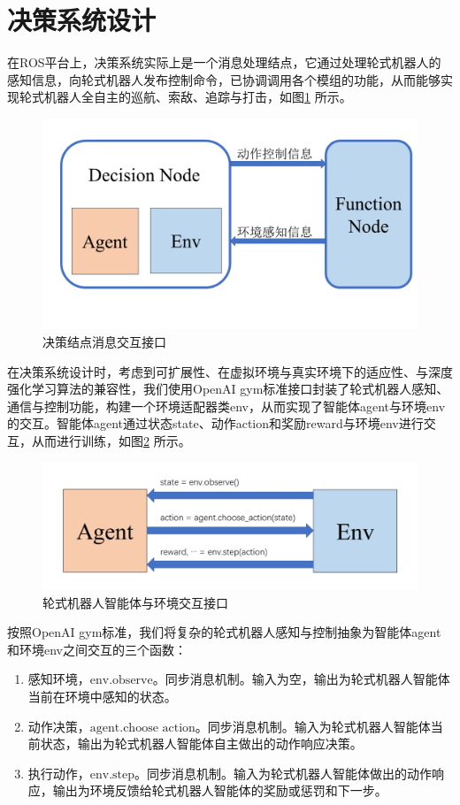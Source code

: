 \section{决策系统设计}
在ROS平台上，决策系统实际上是一个消息处理结点，它通过处理轮式机器人的感知信息，向轮式机器人发布控制命令，已协调调用各个模组的功能，从而能够实现轮式机器人全自主的巡航、索敌、追踪与打击，如图\ref{decision} 所示。
\begin{figure}[htb]
  \centering
  \includegraphics[width=\textwidth]{figures/decision.png}
  \caption{决策结点消息交互接口}\label{decision}
\end{figure}

在决策系统设计时，考虑到可扩展性、在虚拟环境与真实环境下的适应性、与深度强化学习算法的兼容性，我们使用OpenAI gym标准接口封装了轮式机器人感知、通信与控制功能，构建一个环境适配器类env，从而实现了智能体agent与环境env的交互。智能体agent通过状态state、动作action和奖励reward与环境env进行交互，从而进行训练，如图\ref{agentenv} 所示。
\begin{figure}[htb]
  \centering
  \includegraphics[width=\textwidth]{figures/agentenv.png}
  \caption{轮式机器人智能体与环境交互接口}\label{agentenv}
\end{figure}

按照OpenAI gym标准，我们将复杂的轮式机器人感知与控制抽象为智能体agent和环境env之间交互的三个函数：
\vspace{-10pt}
\begin{enumerate}
	\item 感知环境，$\text {env.observe}$。同步消息机制。输入为空，输出为轮式机器人智能体当前在环境中感知的状态。
	\item 动作决策，$\text {agent.choose action}$。同步消息机制。输入为轮式机器人智能体当前状态，输出为轮式机器人智能体自主做出的动作响应决策。
	\item 执行动作，$\text {env.step}$。同步消息机制。输入为轮式机器人智能体做出的动作响应，输出为环境反馈给轮式机器人智能体的奖励或惩罚和下一步。
\end{enumerate}

